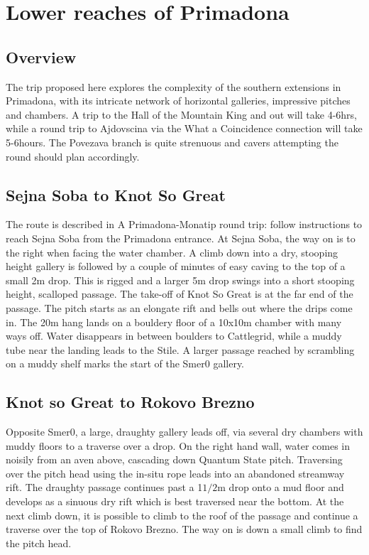 \section{Lower reaches of Primadona}

\subsection{Overview}
The trip proposed here explores the complexity of the southern extensions in Primadona, with its intricate network of horizontal galleries, impressive pitches and chambers. A trip to the Hall of the Mountain King and out will take 4-6hrs, while a round trip to Ajdovscina via the What a Coincidence connection will take 5-6hours. The Povezava branch is quite strenuous and cavers attempting the round should plan accordingly. 

\subsection{Sejna Soba to Knot So Great}
The route is described in A Primadona-Monatip round trip: follow instructions to reach Sejna Soba from the Primadona entrance. At Sejna Soba, the way on is to the right when facing the water chamber. A climb down into a dry, stooping height gallery is followed by a couple of minutes of easy caving to the top of a small 2m drop. This is rigged and a larger 5m drop swings into a short stooping height, scalloped passage. The take-off of Knot So Great is at the far end of the passage. The pitch starts as an elongate rift and bells out where the drips come in. The 20m hang lands on a bouldery floor of a 10x10m chamber with many ways off. Water disappears in between boulders to Cattlegrid, while a muddy tube near the landing leads to the Stile. A larger passage reached by scrambling on a muddy shelf marks the start of the Smer0 gallery.

\subsection{Knot so Great to Rokovo Brezno}
 Opposite Smer0, a large, draughty gallery leads off, via several dry chambers with muddy floors to a traverse over a drop. On the right hand wall, water comes in noisily from an aven above, cascading down Quantum State pitch. Traversing over the pitch head using the in-situ rope leads into an abandoned streamway rift.  The draughty passage continues past a 1$1/2$m drop onto a mud floor and develops as a sinuous dry rift which is best traversed near the bottom. At the next climb down, it is possible to climb to the roof of the passage and continue a traverse over the top of Rokovo Brezno. The way on is down a small climb to find the pitch head.

